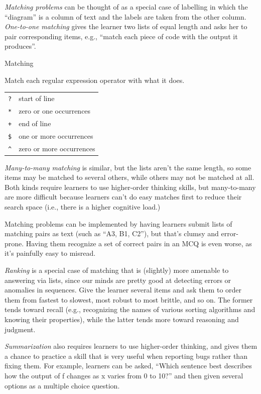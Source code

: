 \emph{Matching problems} can be thought of as a special case of
labelling in which the ``diagram'' is a column of text and the labels
are taken from the other column.  \emph{One-to-one matching} gives the
learner two lists of equal length and asks her to pair corresponding
items, e.g., ``match each piece of code with the output it produces''.

\begin{callout}{Matching}

  Match each regular expression operator with what it does.

  \begin{tabular}{ll}
    \texttt{?} & start of line \\
    \texttt{*} & zero or one occurrences \\
    \texttt{+} & end of line \\
    \texttt{\$} & one or more occurrences \\
    \texttt{\textasciicircum} & zero or more occurrences \\
  \end{tabular}

\end{callout}

\emph{Many-to-many matching} is similar, but the lists aren't the same
length, so some items may be matched to several others, while others
may not be matched at all. Both kinds require learners to use
higher-order thinking skills, but many-to-many are more difficult
because learners can't do easy matches first to reduce their search
space (i.e., there is a higher cognitive load.)

Matching problems can be implemented by having learners submit lists
of matching pairs as text (such as ``A3, B1, C2''), but that's clumsy
and error-prone.  Having them recognize a set of correct pairs in an
MCQ is even worse, as it's painfully easy to misread.

\emph{Ranking} is a special case of matching that is (slightly) more
amenable to answering via lists, since our minds are pretty good at
detecting errors or anomalies in sequences.  Give the learner several
items and ask them to order them from fastest to slowest, most robust
to most brittle, and so on.  The former tends toward recall (e.g.,
recognizing the names of various sorting algorithms and knowing their
properties), while the latter tends more toward reasoning and
judgment.

\emph{Summarization} also requires learners to use higher-order
thinking, and gives them a chance to practice a skill that is very
useful when reporting bugs rather than fixing them. For example,
learners can be asked, ``Which sentence best describes how the output
of f changes as x varies from 0 to 10?'' and then given several
options as a multiple choice question.

